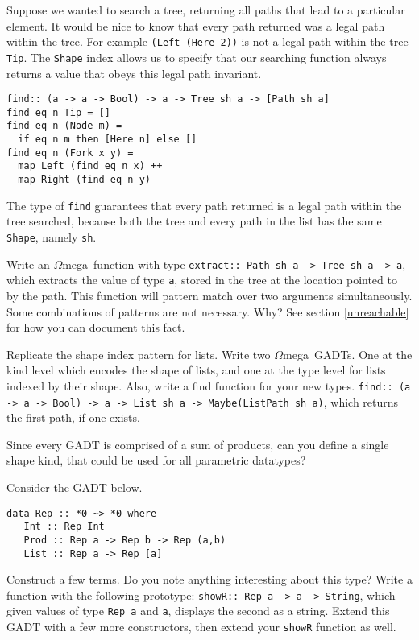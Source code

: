 \documentclass[11pt,twoside,A4]{llncs}
\newcommand{\om}{\emph{$\Omega$}mega}
\begin{document}
Suppose we wanted to search a tree, returning all paths that
lead to a particular element. It would be nice to know that
every path returned was a legal path within the tree. For example
{\tt (Left (Here 2))} is not a legal path within the tree {\tt Tip}.
The {\tt Shape} index allows us to specify that our searching function
always returns a value that obeys this legal path invariant.

{\small
\begin{verbatim}
find:: (a -> a -> Bool) -> a -> Tree sh a -> [Path sh a]
find eq n Tip = []
find eq n (Node m) =
  if eq n m then [Here n] else []
find eq n (Fork x y) = 
  map Left (find eq n x) ++ 
  map Right (find eq n y)
\end{verbatim}}

\noindent
The type of {\tt find} guarantees that every path returned is a legal
path within the tree searched, because both the tree and every path
in the list has the same {\tt Shape}, namely {\tt sh}.

\begin{exercise} \label{extract}
Write an \om\ function with type
{\tt extract:: Path sh a -> Tree sh a -> a}, which extracts
the value of type {\tt a}, stored in the tree at the
location pointed to by the path. This function will pattern
match over two arguments simultaneously. Some combinations
of patterns are not necessary. Why? See section
\ref{unreachable} for how you can document this fact.
\end{exercise}

\begin{exercise} 
Replicate the shape index pattern for lists.
Write two \om\ GADTs. One at the kind level which encodes
the shape of lists, and one at the type level for lists
indexed by their shape. Also, write a find function for
your new types. {\tt find:: (a -> a -> Bool) -> a -> List sh a -> Maybe(ListPath sh a)},
which returns the first path, if one exists.

Since every GADT is comprised of a sum of products, can you define
a single shape kind, that could be used for all parametric
datatypes?
\end{exercise}

\begin{exercise} \label{reptype}
Consider the GADT below.
{\small
\begin{verbatim}
data Rep :: *0 ~> *0 where
   Int :: Rep Int
   Prod :: Rep a -> Rep b -> Rep (a,b)
   List :: Rep a -> Rep [a]
\end{verbatim}}
Construct a few terms. Do you note anything interesting
about this type? Write a function with the following prototype:
{\tt showR:: Rep a -> a -> String}, which given values
of type {\tt Rep a} and {\tt a}, displays the second as a string.
Extend this GADT with a few more constructors, then extend your
{\tt showR} function as well.
\end{exercise}
\end{document}
